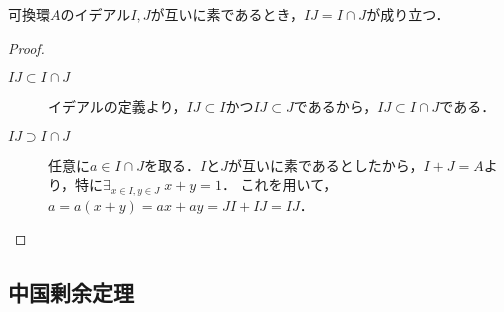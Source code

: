 \documentclass[uplatex,dvipdfmx]{jsreport}
\begin{document}
\begin{lemma}\label{lemma-product-of-ideals}
    可換環$A$のイデアル$I,J$が互いに素であるとき，$IJ=I\cap J$が成り立つ．
\end{lemma}
\begin{proof}\mbox{}
    \begin{description}
        \item[$IJ\subset I\cap J$] イデアルの定義より，$IJ\subset I$かつ$IJ\subset J$であるから，$IJ\subset I\cap J$である．
        \item[$IJ\supset I\cap J$] 
        任意に$a\in I\cap J$を取る．$I$と$J$が互いに素であるとしたから，$I+J=A$より，特に$\exists_{x\in I,y\in J}\;x+y=1$．
        これを用いて，$a=a(x+y)=ax+ay=JI+IJ=IJ$．
    \end{description}
\end{proof}

\subsection{中国剰余定理}
\end{document}
